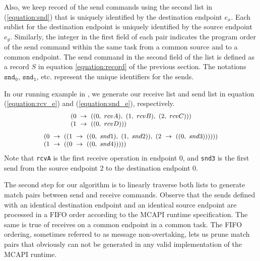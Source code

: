 Also, we keep record of the send commands using the second list in (\ref{equation:snd}) that is uniquely identified by the destination endpoint $\mathit{e}_x$. Each sublist for the destination endpoint is uniquely identified by the source endpoint $\mathit{e}_y$. Similarly, the integer in the first field of each pair indicates the program order of the send command within the same task from a common source and to a common endpoint. The send command in the second field of the list is defined as a record $S$ in equation \ref{equation:record} of the previous section. The notations $\mathtt{snd_{0}}$, $\mathtt{snd_{1}}$, etc. represent the unique identifiers for the sends.

In our running example in , we generate our receive list and send list in equation (\ref{equation:rcv_e}) and (\ref{equation:snd_e}), respectively.
\begin{equation}
\footnotesize \begin{array}{l}
(0\ \rightarrow\ ((0,\ rcvA),\ (1,\ rcvB),\ (2,\ rcvC)))\\
(1\ \rightarrow\ ((0,\ rcvD)))\\
\end{array}
\label{equation:rcv_e}
\end{equation}
\begin{equation}
\footnotesize \begin{array}{l}
(0\ \rightarrow\ ((1\ \rightarrow\ ((0,\ snd1),\ (1,\ snd2)),\ (2\ \rightarrow\ ((0,\ snd3))))))\\
(1\ \rightarrow\ ((0\ \rightarrow\ ((0,\ snd4)))))\\
\end{array}
\label{equation:snd_e}
\end{equation}
Note that \texttt{rcvA} is the first receive operation in endpoint 0, and \texttt{snd3} is the first send from the source endpoint 2 to the destination endpoint 0.

The second step for our algorithm is to linearly traverse both lists to generate match pairs between send and receive commands. Observe that the sends defined with an identical destination endpoint and an identical source endpoint are processed in a FIFO order according to the MCAPI runtime specification. The same is true of receives on a common endpoint in a common task. The FIFO ordering, sometimes referred to as message non-overtaking, lets us prune match pairs that obviously can not be generated in any valid implementation of the MCAPI runtime.


